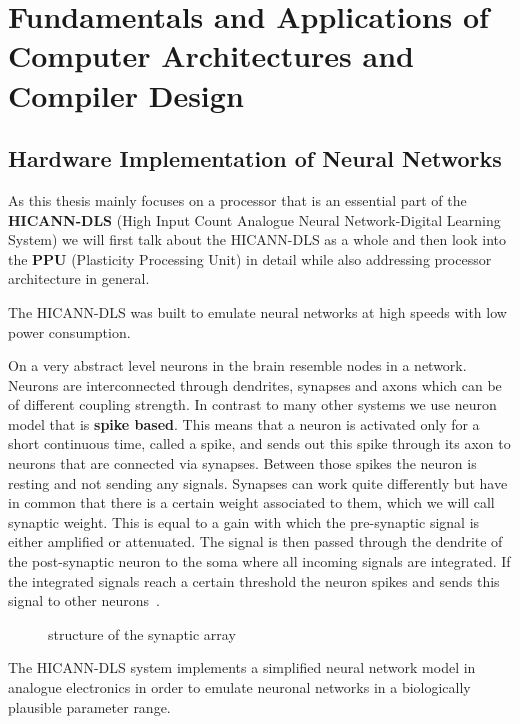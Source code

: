 \chapter{Fundamentals and Applications of Computer Architectures and Compiler Design}
\label{chapter:methods}

\section{Hardware Implementation of Neural Networks}
As this thesis mainly focuses on a processor that is an essential part of the \textbf{HICANN-DLS} (High Input Count Analogue Neural Network-Digital Learning System) we will first talk about the HICANN-DLS as a whole and then look into the \textbf{PPU} (Plasticity Processing Unit) in detail while also addressing processor architecture in general.

The HICANN-DLS was built to emulate neural networks at high speeds with low power consumption.

On a very abstract level neurons in the brain resemble nodes in a network.
Neurons are interconnected through dendrites, synapses and axons which can be of different coupling strength. 
In contrast to many other systems  we use neuron model that is \textbf{spike based}.
This means that a neuron is activated only for a short continuous time, called a spike, and sends out this spike through its axon to neurons that are connected via synapses.
Between those spikes the neuron is resting and not sending any signals.
Synapses can work quite differently but have in common that there is a certain weight associated to them, which we will call synaptic weight.
This is equal to a gain with which the pre-synaptic signal is either amplified or attenuated.
The signal is then passed through the dendrite of the post-synaptic neuron to the soma where all incoming signals are integrated.
If the integrated signals reach a certain threshold the neuron spikes and sends this signal to other neurons~\citep{silbernagl2009color}.

\begin{figure}[htpb]
    \centering
    \caption{\label{fig:array} structure of the synaptic array}
\end{figure}

The HICANN-DLS system implements a simplified neural network model in analogue electronics in order to emulate neuronal networks in a biologically plausible parameter range.

